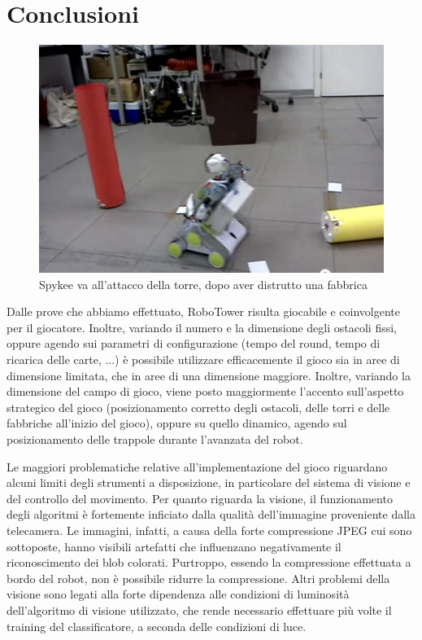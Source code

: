 \chapter{Conclusioni}
\label{cap:conclusioni}


\begin{figure}
\centering
\includegraphics[scale=0.7]{images/attaccotorre}
\caption{Spykee va all'attacco della torre, dopo aver distrutto una fabbrica}
\end{figure}

Dalle prove che abbiamo effettuato, RoboTower risulta giocabile e coinvolgente per il giocatore. Inoltre, variando il numero e la dimensione degli ostacoli fissi, oppure agendo sui parametri di configurazione (tempo del round, tempo di ricarica delle carte, ...) è possibile utilizzare efficacemente il gioco sia in aree di dimensione limitata, che in aree di una dimensione maggiore. Inoltre, variando la dimensione del campo di gioco, viene posto maggiormente l'accento sull'aspetto strategico del gioco (posizionamento corretto degli ostacoli, delle torri e delle fabbriche all'inizio del gioco), oppure su quello dinamico, agendo sul posizionamento delle trappole durante l'avanzata del robot.

Le maggiori problematiche relative all'implementazione del gioco riguardano alcuni limiti degli strumenti a disposizione, in particolare del sistema di visione e del controllo del movimento. Per quanto riguarda la visione, il funzionamento degli algoritmi è fortemente inficiato dalla qualità dell'immagine proveniente dalla telecamera. Le immagini, infatti, a causa della forte compressione JPEG cui sono sottoposte, hanno visibili artefatti che influenzano negativamente il riconoscimento dei blob colorati. Purtroppo, essendo la compressione effettuata a bordo del robot, non è possibile ridurre la compressione. Altri problemi della visione sono legati alla forte dipendenza alle condizioni di luminosità dell'algoritmo di visione utilizzato, che rende necessario effettuare più volte il training del classificatore, a seconda delle condizioni di luce.

